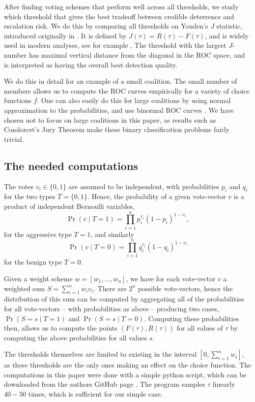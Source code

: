After finding voting schemes that perform well across all thresholds, we study which threshold that gives the best tradeoff between credible deterrence and escalation risk. We do this by comparing all thresholds on Youden's $J$ statistic, introduced originally in \parencite{Youden_1950}. It is defined by $J(\tau) = R(\tau)-F(\tau)$, and is widely used in modern analyses, see for example \parencite{Fluss_2005}. The threshold with the largest $J$-number has maximal vertical distance from the diagonal in the ROC space, and is interpreted as having the overall best detection quality. 

We do this in detail for an example of a small coalition. The small number of members allows us to compute the ROC curves empirically for a variety of choice functions $f$. One can also easily do this for large coalitions by using normal approximation to the probabilities, and use binormal ROC curves \parencite{Metz_1978}. We have chosen not to focus on large coalitions in this paper, as results such as Condorcet's Jury Theorem \parencite{Condorcet_1785, List-Goodin_2001} make these binary classification problems fairly trivial. 

\subsection{The needed computations}
The votes $v_i \in \{0,1\}$ are assumed to be independent, with probabilities $p_i$ and $q_i$ for the two types $T=\{0,1\}$. Hence, the probability of a given vote-vector $v$ is a product of independent Bernoulli variables, 
\[\Pr(v \mid T=1) = \prod_{i=1}^n p_i^{v_i}(1-p_i)^{1-v_i},\]
for the aggressive type $T=1$, and similarly 
\[\Pr(v \mid T=0) = \prod_{i=1}^n q_i^{v_i}(1-q_i)^{1-v_i}\]
for the benign type $T=0$. 

Given a weight scheme $w=[w_1, \dots, w_n]$, we have for each vote-vector $v$ a weighted sum $S=\sum_{i=1}^n w_i v_i$. There are $2^n$ possible vote-vectors, hence the distribution of this sum can be computed by aggregating all of the probabilities for all vote-vectors -- with probabilities as above -- producing two cases, $\Pr(S = s \mid T=1)$ and $\Pr(S = s \mid T=0).$ Computing these probabilities then, allows us to compute the points $(F(\tau), R(\tau))$ for all values of $\tau$ by computing the above probabilities for all values $s$. 

The thresholds themselves are limited to existing in the interval $[0, \sum_{i=1}^n w_i]$, as these thresholds are the only ones making an effect on the choice function. The computations in this paper were done with a simple python script, which can be downloaded from the authors GitHub page \parencite{GitHub}. The program samples $\tau$ linearly $40-50$ times, which is sufficient for our simple case. 

